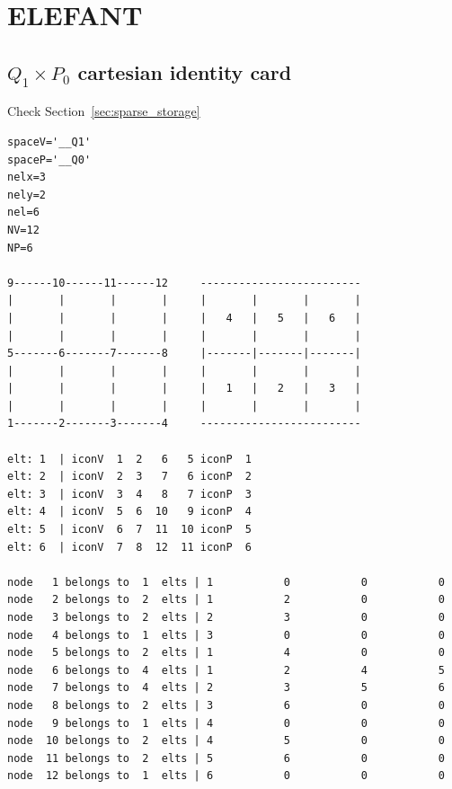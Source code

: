 \section{ELEFANT} %





























\newpage
\subsection{$Q_1\times P_0$ cartesian identity card}

Check Section~\ref{sec:sparse_storage}

\begin{small}
\begin{verbatim}
spaceV='__Q1'
spaceP='__Q0'
nelx=3
nely=2
nel=6
NV=12
NP=6

9------10------11------12     -------------------------
|       |       |       |     |       |       |       |
|       |       |       |     |   4   |   5   |   6   |
|       |       |       |     |       |       |       |
5-------6-------7-------8     |-------|-------|-------|
|       |       |       |     |       |       |       |
|       |       |       |     |   1   |   2   |   3   |
|       |       |       |     |       |       |       | 
1-------2-------3-------4     ------------------------- 

elt: 1  | iconV  1  2   6   5 iconP  1
elt: 2  | iconV  2  3   7   6 iconP  2
elt: 3  | iconV  3  4   8   7 iconP  3
elt: 4  | iconV  5  6  10   9 iconP  4
elt: 5  | iconV  6  7  11  10 iconP  5
elt: 6  | iconV  7  8  12  11 iconP  6

node   1 belongs to  1  elts | 1           0           0           0
node   2 belongs to  2  elts | 1           2           0           0
node   3 belongs to  2  elts | 2           3           0           0
node   4 belongs to  1  elts | 3           0           0           0
node   5 belongs to  2  elts | 1           4           0           0
node   6 belongs to  4  elts | 1           2           4           5
node   7 belongs to  4  elts | 2           3           5           6
node   8 belongs to  2  elts | 3           6           0           0
node   9 belongs to  1  elts | 4           0           0           0
node  10 belongs to  2  elts | 4           5           0           0
node  11 belongs to  2  elts | 5           6           0           0
node  12 belongs to  1  elts | 6           0           0           0

\end{verbatim}
\end{small}

